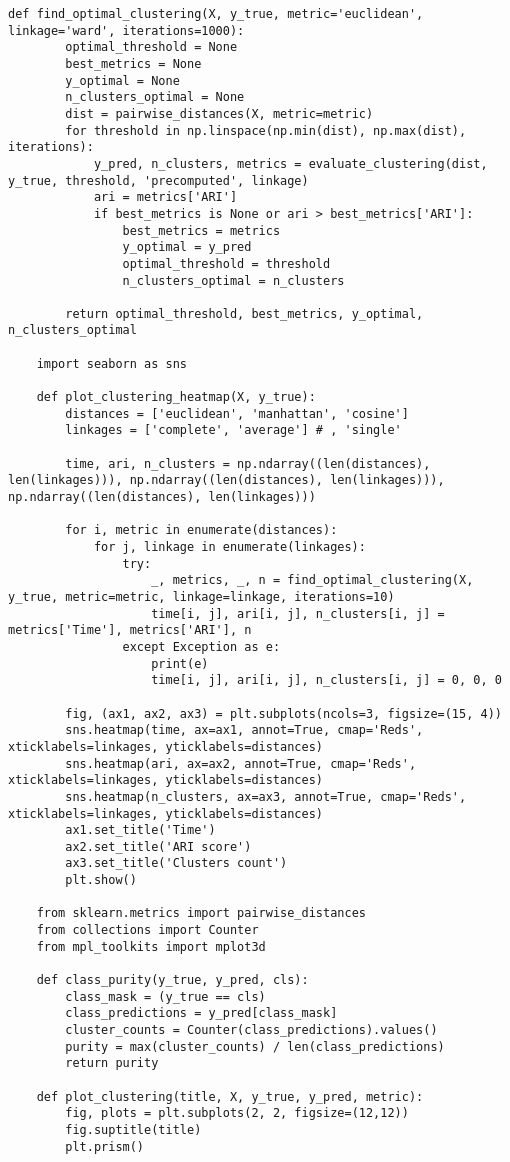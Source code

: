 \begin{lstlisting}[label=lst:1,caption=Кластеризация респондентов социологического исследования]
	def find_optimal_clustering(X, y_true, metric='euclidean', linkage='ward', iterations=1000):
		optimal_threshold = None
		best_metrics = None
		y_optimal = None
		n_clusters_optimal = None
		dist = pairwise_distances(X, metric=metric)
		for threshold in np.linspace(np.min(dist), np.max(dist), iterations):
			y_pred, n_clusters, metrics = evaluate_clustering(dist, y_true, threshold, 'precomputed', linkage)
			ari = metrics['ARI']
			if best_metrics is None or ari > best_metrics['ARI']:
				best_metrics = metrics
				y_optimal = y_pred
				optimal_threshold = threshold
				n_clusters_optimal = n_clusters
		
		return optimal_threshold, best_metrics, y_optimal, n_clusters_optimal
	
	import seaborn as sns
	
	def plot_clustering_heatmap(X, y_true):
		distances = ['euclidean', 'manhattan', 'cosine']
		linkages = ['complete', 'average'] # , 'single'
		
		time, ari, n_clusters = np.ndarray((len(distances), len(linkages))), np.ndarray((len(distances), len(linkages))), np.ndarray((len(distances), len(linkages)))
		
		for i, metric in enumerate(distances):
			for j, linkage in enumerate(linkages):
				try:
					_, metrics, _, n = find_optimal_clustering(X, y_true, metric=metric, linkage=linkage, iterations=10)
					time[i, j], ari[i, j], n_clusters[i, j] = metrics['Time'], metrics['ARI'], n
				except Exception as e:
					print(e)
					time[i, j], ari[i, j], n_clusters[i, j] = 0, 0, 0
		
		fig, (ax1, ax2, ax3) = plt.subplots(ncols=3, figsize=(15, 4))
		sns.heatmap(time, ax=ax1, annot=True, cmap='Reds', xticklabels=linkages, yticklabels=distances)
		sns.heatmap(ari, ax=ax2, annot=True, cmap='Reds', xticklabels=linkages, yticklabels=distances)
		sns.heatmap(n_clusters, ax=ax3, annot=True, cmap='Reds', xticklabels=linkages, yticklabels=distances)
		ax1.set_title('Time')
		ax2.set_title('ARI score')
		ax3.set_title('Clusters count')
		plt.show()
	
	from sklearn.metrics import pairwise_distances
	from collections import Counter
	from mpl_toolkits import mplot3d
	
	def class_purity(y_true, y_pred, cls):
		class_mask = (y_true == cls)
		class_predictions = y_pred[class_mask]
		cluster_counts = Counter(class_predictions).values()
		purity = max(cluster_counts) / len(class_predictions)
		return purity
	
	def plot_clustering(title, X, y_true, y_pred, metric):
		fig, plots = plt.subplots(2, 2, figsize=(12,12))
		fig.suptitle(title)
		plt.prism()
		

\end{lstlisting}
